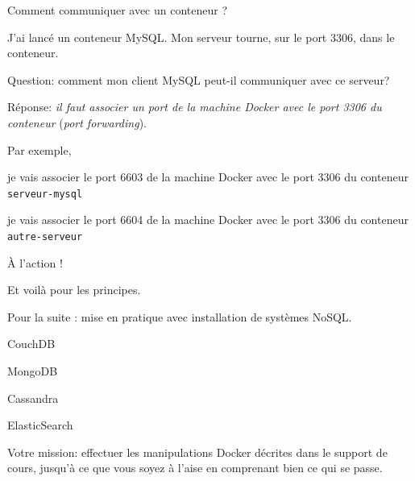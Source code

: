 \begin{frame}{Comment communiquer avec un conteneur ?}

J'ai lancé un conteneur MySQL. Mon serveur tourne, sur le port 3306, \alert{dans le conteneur}.

\vfill

\alert{Question:} comment mon client MySQL peut-il communiquer avec ce serveur?

\vfill

\alert{Réponse}: \emph{il faut associer un port de la machine Docker avec le port 
3306 du conteneur} (\textit{port forwarding}).

\vfill

Par exemple, 
\begin{redbullet}
 \item je vais associer  le port 6603 de la machine Docker avec le port 3306 du conteneur \texttt{serveur-mysql}
 \item je vais associer le port 6604 de la machine Docker avec le port 3306 du conteneur \texttt{autre-serveur}
\end{redbullet}


\end{frame}

\begin{frame}{À l'action !}

Et voilà pour les principes.

\vfill

Pour la suite : mise en pratique avec installation de systèmes NoSQL.

\begin{redbullet}
  \item CouchDB
  \item MongoDB
  \item Cassandra
  \item ElasticSearch
\end{redbullet}

\vfill

\alert{Votre mission}: effectuer les manipulations Docker décrites dans le support de cours, jusqu'à ce que vous 
soyez à l'aise \alert{en comprenant bien ce qui se passe.}


\end{frame}

